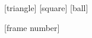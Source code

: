 \usepackage{bm}
\usepackage{stackengine} 
\stackMath
\usepackage{array}
\usepackage{amsmath}

[triangle]
[square]
[ball]

[frame number] %